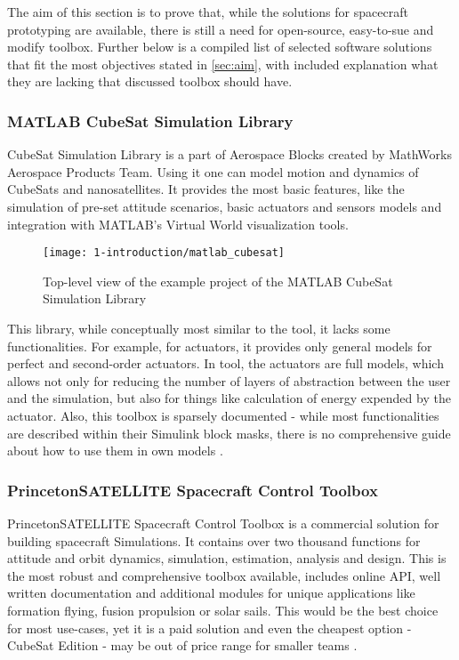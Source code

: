     The aim of this section is to prove that, while the solutions for spacecraft prototyping are available, there is still a need for open-source, easy-to-sue and modify toolbox. Further below is a compiled list of selected software solutions that fit the most objectives stated in \autoref{sec:aim}, with included explanation what they are lacking that discussed toolbox should have.
 

    \subsubsection{MATLAB CubeSat Simulation Library}
        CubeSat Simulation Library is a part of Aerospace Blocks created by MathWorks Aerospace Products Team. Using it one can model motion and dynamics of CubeSats and nanosatellites. It provides the most basic features, like the simulation of pre-set attitude scenarios, basic actuators and sensors models and integration with MATLAB's Virtual World visualization tools.
        
        \begin{figure}[H]
            \centering
            \texttt{[image: 1-introduction/matlab\_cubesat]}
            \caption{Top-level view of the example project of the MATLAB CubeSat Simulation Library}
            \label{fig:matlab_cubesat}
        \end{figure}

        This library, while conceptually most similar to the \ac{tool}, it lacks some functionalities. For example, for actuators, it provides only general models for perfect and second-order actuators. In \ac{tool}, the actuators are full models, which allows not only for reducing the number of layers of abstraction between the user and the simulation, but also for things like calculation of energy expended by the actuator. Also, this toolbox is sparsely documented - while most functionalities are described within their Simulink block masks, there is no comprehensive guide about how to use them in own models \cite{matlabcubesat}.

    \subsubsection{PrincetonSATELLITE Spacecraft Control Toolbox}
        PrincetonSATELLITE Spacecraft Control Toolbox is a commercial solution for building spacecraft Simulations. It contains over two thousand functions for attitude and orbit dynamics, simulation, estimation, analysis and design. This is the most robust and comprehensive toolbox available, includes online API, well written documentation and additional modules for unique applications like formation flying, fusion propulsion or solar sails. This would be the best choice for most use-cases, yet it is a paid solution and even the cheapest option - CubeSat Edition - may be out of price range for smaller teams \cite{princeton}.

